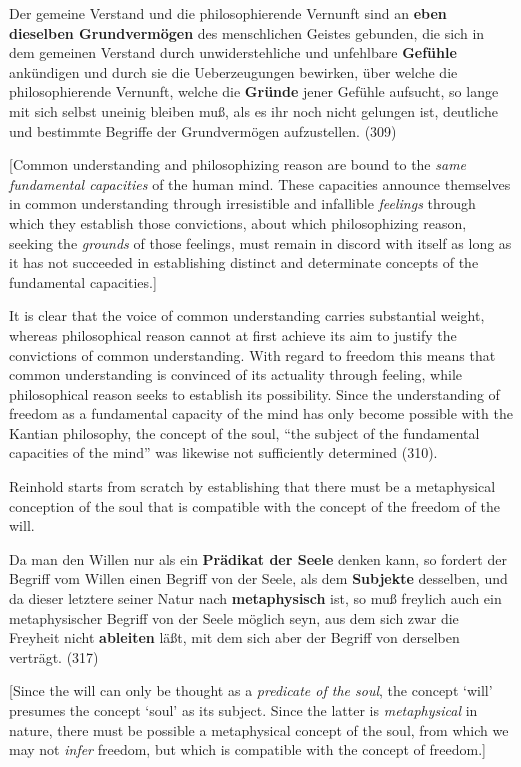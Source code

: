 Der gemeine Verstand und die philosophierende Vernunft sind an \textbf{eben dieselben Grundverm\"{o}gen} des menschlichen Geistes gebunden, die sich in dem gemeinen Verstand durch unwiderstehliche und unfehlbare \textbf{Gef\"{u}hle} ank\"{u}ndigen und durch sie die Ueberzeugungen bewirken, \"{u}ber welche die philosophierende Vernunft, welche die \textbf{Gr\"{u}nde} jener Gef\"{u}hle aufsucht, so lange mit sich selbst uneinig bleiben mu\ss{}, als es ihr noch nicht gelungen ist, deutliche und bestimmte Begriffe der Grundverm\"{o}gen aufzustellen. (309)

[Common understanding and philosophizing reason are bound to the \textit{same fundamental capacities} of the human mind. These capacities announce themselves in common understanding through irresistible and infallible \textit{feelings} through which they establish those convictions, about which philosophizing reason, seeking the \textit{grounds} of those feelings, must remain in discord with itself as long as it has not succeeded in establishing distinct and determinate concepts of the fundamental capacities.]

It is clear that the voice of common understanding carries substantial weight, whereas philosophical reason cannot at first achieve its aim to justify the convictions of common understanding. With regard to freedom this means that common understanding is convinced of its actuality through feeling, while philosophical reason seeks to establish its possibility. Since the understanding of freedom as a fundamental capacity of the mind has only become possible with the Kantian philosophy, the concept of the soul, ``the subject of the fundamental capacities of the mind'' was likewise not sufficiently determined (310). 

 Reinhold starts from scratch by establishing that there must be a metaphysical conception of the soul that is compatible with the concept of the freedom of the will. 

Da man den Willen nur als ein \textbf{Pr\"{a}dikat der Seele} denken kann, so fordert der Begriff vom Willen einen Begriff von der Seele, als dem \textbf{Subjekte} desselben, und da dieser letztere seiner Natur nach \textbf{metaphysisch} ist, so mu\ss{} freylich auch ein metaphysischer Begriff von der Seele m\"{o}glich seyn, aus dem sich zwar die Freyheit nicht \textbf{ableiten} l\"{a}\ss{}t, mit dem sich aber der Begriff von derselben vertr\"{a}gt. (317)

[Since the will can only be thought as a \textit{predicate of the soul}, the concept `will' presumes the concept `soul' as its subject. Since the latter is \textit{metaphysical} in nature, there must be possible a metaphysical concept of the soul, from which we may not \textit{infer} freedom, but which is compatible with the concept of freedom.]

